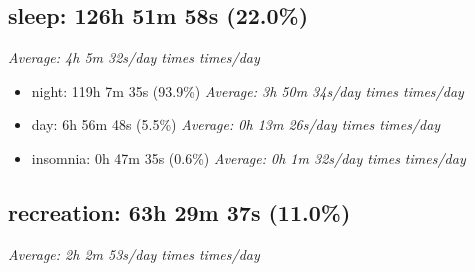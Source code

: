 \documentclass[12pt]{extarticle}
\begin{document}
{\fontsize{16}{19.2}\selectfont\subsection*{sleep: 126h 51m 58s (22.0\%)}}
\textit{Average: 4h 5m 32s/day  times  times/day}\par
\begin{itemize}[topsep=0pt, itemsep=-0.5ex]
    \item night: 119h 7m 35s (93.9\%)
        \textit{Average: 3h 50m 34s/day  times  times/day}\par
    \item day: 6h 56m 48s (5.5\%)
        \textit{Average: 0h 13m 26s/day  times  times/day}\par
    \item insomnia: 0h 47m 35s (0.6\%)
        \textit{Average: 0h 1m 32s/day  times  times/day}\par
\end{itemize}
{\fontsize{16}{19.2}\selectfont\subsection*{recreation: 63h 29m 37s (11.0\%)}}
\textit{Average: 2h 2m 53s/day  times  times/day}\par
\end{document}

